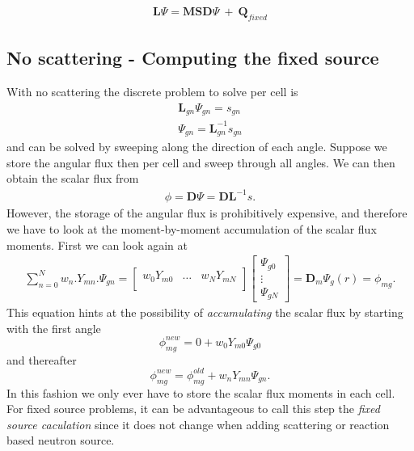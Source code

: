 \documentclass[11pt,letterpaper,titlepage]{article}
\numberwithin{equation}{section}
\begin{document}
\begin{align} \label{eq:NTEoperatorform}
\mathbf{L}\Psi 
= \mathbf{M} \mathbf{S} \mathbf{D} \Psi \
+ \ \mathbf{Q}_{fixed}
\end{align}




\subsection{No scattering - Computing the fixed source}
With no scattering the discrete problem to solve per cell is 
\begin{align*}
\mathbf{L}_{gn}\Psi_{gn} 
= 
s_{gn} \\
\Psi_{gn} 
= 
\mathbf{L}_{gn}^{-1} s_{gn} 
\end{align*}
and can be solved by sweeping along the direction of each angle. Suppose we store the angular flux then per cell and sweep through all angles. We can then obtain the scalar flux from
\begin{align*}
\phi = \mathbf{D}\Psi
= 
\mathbf{D}\mathbf{L}^{-1} s.
\end{align*}
However, the storage of the angular flux is prohibitively expensive, and therefore we have to look at the moment-by-moment accumulation of the scalar flux moments. First we can look again at 
\begin{align*}
\sum_{n=0}^{N} w_{n} . Y_{mn}.\Psi_{gn}
= 
\begin{bmatrix}
w_0 Y_{m0} &\hdots  &w_{N} Y_{mN}\\
\end{bmatrix}
\begin{bmatrix}
\Psi_{g0} \\
\vdots    \\
\Psi_{gN}
\end{bmatrix}
=\mathbf{D}_m\Psi_{g}(r) =\phi_{mg}.
\end{align*}
This equation hints at the possibility of \textit{accumulating} the scalar flux by starting with the first angle
$$\phi_{mg}^{new}=0+w_0 Y_{m0}\Psi_{g0}$$
and thereafter
$$\phi_{mg}^{new}=\phi_{mg}^{old}+w_n Y_{m n}\Psi_{gn}.$$
In this fashion we only ever have to store the scalar flux moments in each cell. For fixed source problems, it can be advantageous to call this step the \textit{fixed source caculation} since it does not change when adding scattering or reaction based neutron source.
\end{document}
